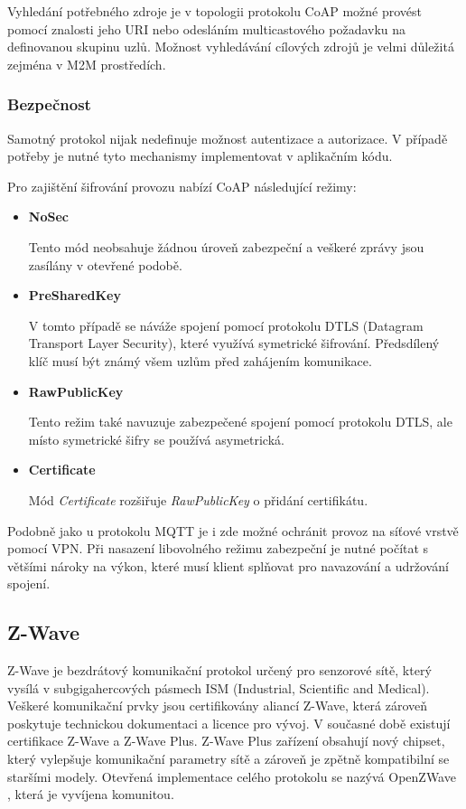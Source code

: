    Vyhledání potřebného zdroje je v topologii protokolu CoAP možné provést pomocí
   znalosti jeho URI nebo odesláním multicastového požadavku na definovanou
   skupinu uzlů. Možnost vyhledávání cílových zdrojů je velmi důležitá zejména
   v M2M prostředích. \cite{coap}
   
   \subsubsection{Bezpečnost}
   Samotný protokol nijak nedefinuje možnost autentizace a autorizace. V případě
   potřeby je nutné tyto mechanismy implementovat v aplikačním kódu. 
   
   Pro zajištění šifrování provozu nabízí CoAP následující režimy:
   \begin{itemize}
    \item \textbf{NoSec}
    
    Tento mód neobsahuje žádnou úroveň zabezpeční a veškeré zprávy jsou zasílány
    v otevřené podobě. 
    
    \item \textbf{PreSharedKey}
    
    V tomto případě se náváže spojení pomocí protokolu DTLS (Datagram Transport
    Layer Security), které využívá symetrické šifrování. Předsdílený klíč musí
    být známý všem uzlům před zahájením komunikace. 
    
    \item \textbf{RawPublicKey}
    
    Tento režim také navuzuje zabezpečené spojení pomocí protokolu DTLS, ale místo
    symetrické šifry se používá asymetrická.
    
    \item \textbf{Certificate}
    
    Mód \textit{Certificate} rozšiřuje \textit{RawPublicKey} o přidání certifikátu.
   \end{itemize}

   Podobně jako u protokolu MQTT je i zde možné ochránit provoz na síťové
   vrstvě pomocí VPN. Při nasazení libovolného režimu zabezpeční je nutné počítat 
   s většími nároky na výkon, které musí klient splňovat pro navazování a udržování 
   spojení. \cite{coap}
   
  \subsection{Z-Wave}
  
  Z-Wave je bezdrátový komunikační protokol určený pro senzorové sítě, který vysílá 
  v subgigahercových pásmech ISM (Industrial, Scientific and Medical). Veškeré komunikační
  prvky jsou certifikovány aliancí Z-Wave, která zároveň poskytuje technickou dokumentaci a
  licence pro vývoj. V současné době existují certifikace Z-Wave a Z-Wave Plus. 
  Z-Wave Plus zařízení obsahují nový chipset, který vylepšuje komunikační parametry
  sítě a zároveň je zpětně kompatibilní se staršími modely. \cite{z-plus}
  Otevřená implementace celého protokolu se nazývá OpenZWave \cite{openzwave}, která
  je vyvíjena komunitou. \cite{cesnet-survey} 
 
